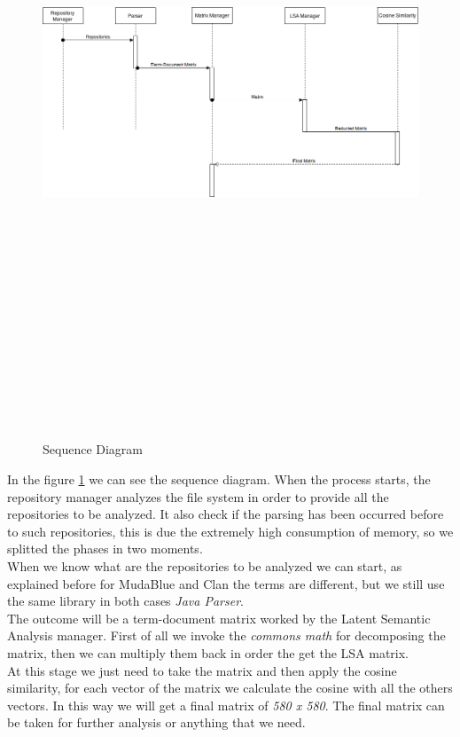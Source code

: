 \begin{figure}[!h]
	\includegraphics[width=15cm,height=20cm,keepaspectratio]{images/SequenceDiagram.png}
	\caption{Sequence Diagram}
	\label{fig:Sequence}
\end{figure}

In the figure \ref{fig:Sequence} we can see the sequence diagram.
When the process starts, the repository manager analyzes the file system in order to provide all the repositories to be analyzed. It also check if the parsing has been occurred before to such repositories, this is due the extremely high consumption of memory, so we splitted the phases in two moments.\\
When we know what are the repositories to be analyzed we can start, as explained before for MudaBlue and Clan the terms are different, but we still use the same library in both cases \emph{Java Parser}.\\
The outcome will be a term-document matrix worked by the Latent Semantic Analysis manager.
First of all we invoke the \emph{commons math} for decomposing the matrix, then we can multiply them back in order the get the LSA matrix.\\
At this stage we just need to take the matrix and then apply the cosine similarity, for each vector of the matrix we calculate the cosine with all the others vectors. In this way we will get a final matrix of \emph{580 x 580}.
The final matrix can be taken for further analysis or anything that we need.




